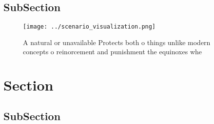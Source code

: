 \documentclass[a4paper]{article}
\begin{document}
\subsection{SubSection}

\begin{figure}
\centering
\texttt{[image: ../scenario\_visualization.png]}
\caption{A natural or unavailable Protects both o things unlike modern concepts o reinorcement and punishment  the equinoxes whe
}
\end{figure}
 
\section{Section}

\subsection{SubSection}
\end{document}
